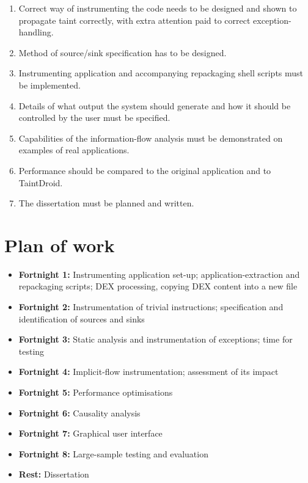 \documentclass[12pt]{article}
\begin{document}
\begin{enumerate}

\item Correct way of instrumenting the code needs to be designed and shown
       to propagate taint correctly, with extra attention paid to correct
       exception-handling.

\item Method of source/sink specification has to be designed.

\item Instrumenting application and accompanying repackaging shell scripts
       must be implemented.

\item Details of what output the system should generate and how it
       should be controlled by the user must be specified.

\item Capabilities of the information-flow analysis must be demonstrated
       on examples of real applications.

\item Performance should be compared to the original application and to
       TaintDroid.

\item The dissertation must be planned and written.

\end{enumerate}

\section*{Plan of work}

\begin{itemize}
	\item{\textbf{Fortnight 1:} Instrumenting application set-up; 
	      application-extraction and repackaging scripts; DEX processing, 
	      copying DEX content into a new file}
	\item{\textbf{Fortnight 2:} Instrumentation of trivial instructions;
	      specification and identification of sources and sinks}
	\item{\textbf{Fortnight 3:} Static analysis and instrumentation of 
	      exceptions; time for testing}
	\item{\textbf{Fortnight 4:} Implicit-flow instrumentation; assessment 
	      of its impact}
	\item{\textbf{Fortnight 5:} Performance optimisations}
	\item{\textbf{Fortnight 6:} Causality analysis}
	\item{\textbf{Fortnight 7:} Graphical user interface}
	\item{\textbf{Fortnight 8:} Large-sample testing and evaluation}
	\item{\textbf{Rest:} Dissertation}
\end{itemize}

\printbibliography
\end{document}
